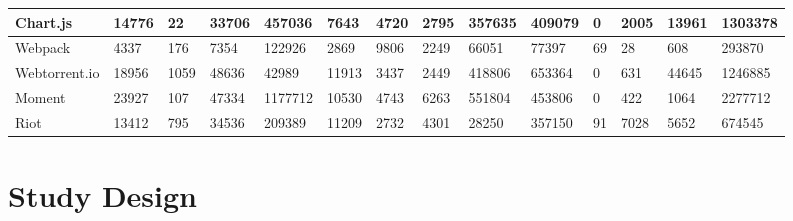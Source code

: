 \documentclass[smallcondensed]{svjour3}
\begin{document}
\begin{table}[!htbp]
{{\begin{tabular}{l|l|l|l|l|l|l|l|l|l|l|l|l|l}
Chart.js      & 14776 & 22    & 33706 & 457036 & 7643 & 4720  & 2795 & 357635 & 409079 & 0   & 2005 & 13961 & 1303378 \\ \hline
Webpack	      & 4337 & 176   & 7354 & 122926 & 2869 & 9806 & 2249 & 66051 & 77397 & 69  & 28  & 608  & 293870 \\ \hline
Webtorrent.io & 18956  & 1059   & 48636  & 42989 & 11913  & 3437  & 2449 & 418806 & 653364 & 0   & 631 & 44645  & 1246885  \\ \hline
Moment	      & 23927 & 107   & 47334 & 1177712 & 10530 & 4743   & 6263 & 551804 & 453806 & 0   & 422  & 1064  & 2277712 \\ \hline
Riot	      & 13412 & 795  & 34536 & 209389 & 11209 & 2732  & 4301 & 28250 & 357150 & 91  & 7028 & 5652  & 674545 \\ \hline
\end{tabular}
}
\vspace{-15pt}
}
\end{table}

\section{Study Design}\label{setup}
\end{document}

